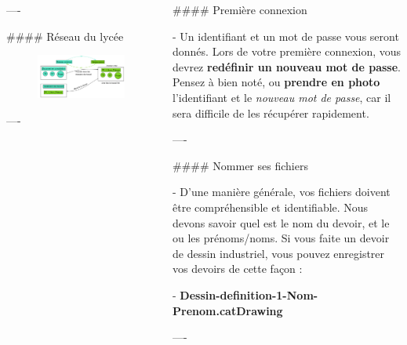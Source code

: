 \documentclass{beamer}
\begin{document}
\begin{frame}[fragile]
\begin{columns}[T]
\begin{column}{.46\textwidth}
\begin{markdown}
----



#### Réseau du lycée


\begin{figure}
\includegraphics[width=1\textwidth]{A1.png} 
\end{figure}

----


\end{markdown}

\end{column}









\begin{column}{.46\textwidth}

\begin{markdown}

#### Première connexion

- Un identifiant et un mot de passe vous seront donnés. Lors de votre première connexion, vous devrez \textbf{redéfinir un nouveau mot de passe}. Pensez à bien noté, ou \textbf{prendre en photo} l'identifiant et le \textit{nouveau mot de passe}, car il sera difficile de les récupérer rapidement.

----

#### Nommer ses fichiers

- D’une manière générale, vos fichiers doivent être compréhensible et identifiable. Nous devons savoir quel est le nom du devoir, et le ou les prénoms/noms. Si vous faite un devoir de dessin industriel, vous pouvez enregistrer vos devoirs de cette façon :

- \textbf{Dessin-definition-1-Nom-Prenom.catDrawing}

----



\end{markdown}
\end{column}
\end{columns}
\end{frame}
\end{document}
